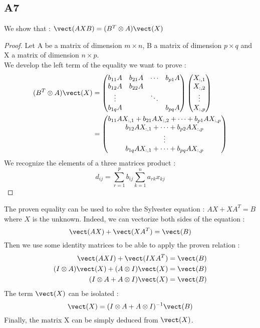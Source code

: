 \documentclass[11pt]{article}
\newcommand{\kp}{\otimes} %
\begin{document}
\subsection*{A7}
We show that : $\vect(AXB)=(B^{T}\kp A)\vect(X)$
\begin{proof}
Let A be a matrix of dimension $m\times n$, B a matrix of dimension $p\times q$ and X a matrix of dimension $n\times p$.\\
We develop the left term of the equality we want to prove :
\begin{align*}
    (B^{T}\kp A)\vect(X) &=
    \begin{pmatrix}
    b_{11}A & b_{21}A & \cdots & b_{p1}A\\
    b_{12}A & b_{22}A & & \\
    \vdots & & \ddots & \\
    b_{1q}A & & & b_{pq}A
    \end{pmatrix}
    \begin{pmatrix}
    X_{:,1}\\
    X_{:,2}\\
    \vdots\\
    X_{:,p}
    \end{pmatrix}\\
    &=
    \begin{pmatrix}
    b_{11}AX_{:,1} + b_{21}AX_{:,2} + \cdots + b_{p1}AX_{:,p}\\
    b_{12}AX_{:,1} + \cdots + b_{p2}AX_{:,p}\\
    \vdots \\
    b_{1q}AX_{:,1} + \cdots + b_{pq}AX_{:,p}
    \end{pmatrix}   
\end{align*}
We recognize the elements of a three matrices product :
\begin{equation*}
    d_{ij}=\sum^{p}_{r=1}b_{ij}\sum^{n}_{k=1}a_{rk}x_{kj}
\end{equation*}
\end{proof}
The proven equality can be used to solve the Sylvester equation : $AX+XA^{T}=B$ where $X$ is the unknown. Indeed, we can vectorize both sides of the equation :
\begin{equation*}
    \vect(AX) + \vect(XA^{T})=\vect(B)
\end{equation*}
Then we use some identity matrices to be able to apply the proven relation :
\begin{align*}
    \vect(AXI) + \vect(IXA^{T})&=\vect(B)\\
    (I\kp A)\vect(X) + (A\kp I) \vect(X)&=\vect(B)\\
    (I\kp A + A\kp I) \vect(X)&=\vect(B)
\end{align*}
The term $\vect(X)$ can be isolated :
\begin{equation*}
    \vect(X)=(I\kp A + A\kp I)^{-1}\vect(B)
\end{equation*}
Finally, the matrix X can be simply deduced from $\vect(X)$.
\end{document}
